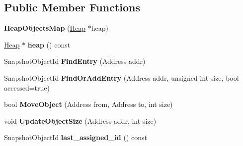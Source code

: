\subsection*{Public Member Functions}
\begin{DoxyCompactItemize}
\item 
{\bfseries Heap\+Objects\+Map} (\hyperlink{classv8_1_1internal_1_1_heap}{Heap} $\ast$heap)\hypertarget{classv8_1_1internal_1_1_heap_objects_map_ae05dd1e9392b3a3389440228746546d2}{}\label{classv8_1_1internal_1_1_heap_objects_map_ae05dd1e9392b3a3389440228746546d2}

\item 
\hyperlink{classv8_1_1internal_1_1_heap}{Heap} $\ast$ {\bfseries heap} () const \hypertarget{classv8_1_1internal_1_1_heap_objects_map_ad291335c6fcb82761fde7152a739ec0e}{}\label{classv8_1_1internal_1_1_heap_objects_map_ad291335c6fcb82761fde7152a739ec0e}

\item 
Snapshot\+Object\+Id {\bfseries Find\+Entry} (Address addr)\hypertarget{classv8_1_1internal_1_1_heap_objects_map_ab5d737fbbba9b33cd3c853eb7b506cf4}{}\label{classv8_1_1internal_1_1_heap_objects_map_ab5d737fbbba9b33cd3c853eb7b506cf4}

\item 
Snapshot\+Object\+Id {\bfseries Find\+Or\+Add\+Entry} (Address addr, unsigned int size, bool accessed=true)\hypertarget{classv8_1_1internal_1_1_heap_objects_map_a0782b8e7d38d2d3f8805bf9525b933c6}{}\label{classv8_1_1internal_1_1_heap_objects_map_a0782b8e7d38d2d3f8805bf9525b933c6}

\item 
bool {\bfseries Move\+Object} (Address from, Address to, int size)\hypertarget{classv8_1_1internal_1_1_heap_objects_map_a4dbb05ebfb10dd823495d0802692a1f5}{}\label{classv8_1_1internal_1_1_heap_objects_map_a4dbb05ebfb10dd823495d0802692a1f5}

\item 
void {\bfseries Update\+Object\+Size} (Address addr, int size)\hypertarget{classv8_1_1internal_1_1_heap_objects_map_a15a31776da26230e3641837998095544}{}\label{classv8_1_1internal_1_1_heap_objects_map_a15a31776da26230e3641837998095544}

\item 
Snapshot\+Object\+Id {\bfseries last\+\_\+assigned\+\_\+id} () const \hypertarget{classv8_1_1internal_1_1_heap_objects_map_a173be928aaaa43dcdb94f97d39bb8a5a}{}\label{classv8_1_1internal_1_1_heap_objects_map_a173be928aaaa43dcdb94f97d39bb8a5a}


\end{DoxyCompactItemize}
